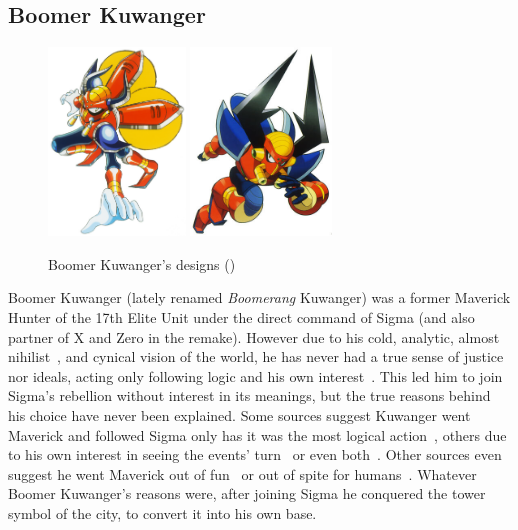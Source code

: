\subsection{Boomer Kuwanger}\label{boss:Boomer_Kuwanger}
\begin{figure}[htp]
	\centering
	\includegraphics[height=5cm]{figures/X1/Boomer_kuwanger/Boomer_kuwanger.jpg}
	\includegraphics[height=5cm]{figures/X1/Boomer_kuwanger/MHXBoomerKuwanger.jpg}
	\caption{Boomer Kuwanger's designs (\cite{book:MMX_Complete_art})}
\end{figure}
Boomer Kuwanger (lately renamed \emph{Boomerang} Kuwanger) was a former Maverick Hunter of the 17th Elite Unit under the direct command of Sigma (and also partner of X and Zero in the \mhx remake). However due to his cold, analytic, almost nihilist~\cite{book:MH_field_guide}, and cynical vision of the world, he has never had a true sense of justice nor ideals, acting only following logic and his own interest~\cite{MHX:manual}. This led him to join Sigma's rebellion without interest in its meanings, but the true reasons behind his choice have never been explained. Some sources suggest Kuwanger went Maverick and followed Sigma only has it was the most logical action~\cite{MHX:manual}, others due to his own interest in seeing the events' turn~\cite{wiki:Boomer_kuwanger} or even both~\cite{book:MH_field_guide}. Other sources even suggest he went Maverick out of fun~\cite{Xcoll1:Manual_X1} or out of spite for humans~\cite{wayback:X_resources}. Whatever Boomer Kuwanger's reasons were, after joining Sigma he conquered the tower symbol of the city, to convert it into his own base.
